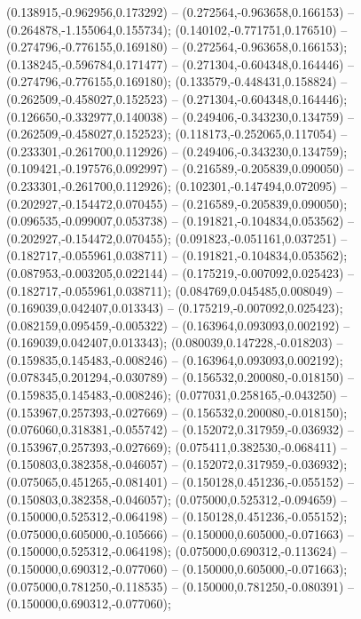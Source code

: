  (0.138915,-0.962956,0.173292) -- (0.272564,-0.963658,0.166153) -- (0.264878,-1.155064,0.155734);
 (0.140102,-0.771751,0.176510) -- (0.274796,-0.776155,0.169180) -- (0.272564,-0.963658,0.166153);
 (0.138245,-0.596784,0.171477) -- (0.271304,-0.604348,0.164446) -- (0.274796,-0.776155,0.169180);
 (0.133579,-0.448431,0.158824) -- (0.262509,-0.458027,0.152523) -- (0.271304,-0.604348,0.164446);
 (0.126650,-0.332977,0.140038) -- (0.249406,-0.343230,0.134759) -- (0.262509,-0.458027,0.152523);
 (0.118173,-0.252065,0.117054) -- (0.233301,-0.261700,0.112926) -- (0.249406,-0.343230,0.134759);
 (0.109421,-0.197576,0.092997) -- (0.216589,-0.205839,0.090050) -- (0.233301,-0.261700,0.112926);
 (0.102301,-0.147494,0.072095) -- (0.202927,-0.154472,0.070455) -- (0.216589,-0.205839,0.090050);
 (0.096535,-0.099007,0.053738) -- (0.191821,-0.104834,0.053562) -- (0.202927,-0.154472,0.070455);
 (0.091823,-0.051161,0.037251) -- (0.182717,-0.055961,0.038711) -- (0.191821,-0.104834,0.053562);
 (0.087953,-0.003205,0.022144) -- (0.175219,-0.007092,0.025423) -- (0.182717,-0.055961,0.038711);
 (0.084769,0.045485,0.008049) -- (0.169039,0.042407,0.013343) -- (0.175219,-0.007092,0.025423);
 (0.082159,0.095459,-0.005322) -- (0.163964,0.093093,0.002192) -- (0.169039,0.042407,0.013343);
 (0.080039,0.147228,-0.018203) -- (0.159835,0.145483,-0.008246) -- (0.163964,0.093093,0.002192);
 (0.078345,0.201294,-0.030789) -- (0.156532,0.200080,-0.018150) -- (0.159835,0.145483,-0.008246);
 (0.077031,0.258165,-0.043250) -- (0.153967,0.257393,-0.027669) -- (0.156532,0.200080,-0.018150);
 (0.076060,0.318381,-0.055742) -- (0.152072,0.317959,-0.036932) -- (0.153967,0.257393,-0.027669);
 (0.075411,0.382530,-0.068411) -- (0.150803,0.382358,-0.046057) -- (0.152072,0.317959,-0.036932);
 (0.075065,0.451265,-0.081401) -- (0.150128,0.451236,-0.055152) -- (0.150803,0.382358,-0.046057);
 (0.075000,0.525312,-0.094659) -- (0.150000,0.525312,-0.064198) -- (0.150128,0.451236,-0.055152);
 (0.075000,0.605000,-0.105666) -- (0.150000,0.605000,-0.071663) -- (0.150000,0.525312,-0.064198);
 (0.075000,0.690312,-0.113624) -- (0.150000,0.690312,-0.077060) -- (0.150000,0.605000,-0.071663);
 (0.075000,0.781250,-0.118535) -- (0.150000,0.781250,-0.080391) -- (0.150000,0.690312,-0.077060);
